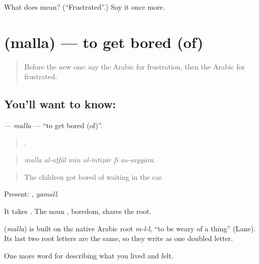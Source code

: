 \begin{tcolorbox}[breakable,colback=teal!4,colframe=teal!35!black,title={Before you move on}]
What does  mean? (\textquotedblleft{}Frustrated\textquotedblright{}.) Say it once more.
\end{tcolorbox}
\section[\texorpdfstring{\ar{مل} (malla)}{مل (malla)}]{ (malla) — to get bored (of)}

\label{lesson:AR-C494-malla}



\begin{quote}
Before the new one: say the Arabic for frustration, then the Arabic for frustrated.
\end{quote}

\subsection*{You'll want to know: }
\textbf{} — \emph{malla} — \textquotedblleft{}to get bored (of)\textquotedblright{}.

\begin{quote}
     .
\end{quote}

\begin{quote}
\emph{malla al-aṭfāl min al-intiẓār fī as-sayyāra.}
\end{quote}

\begin{quote}
The children got bored of waiting in the car.
\end{quote}

Present: , \emph{yamall}.

It takes . The noun , boredom, shares the root.

\begin{cousinweb}
\textbf{} (\emph{malla}) is built on the native Arabic root \emph{m-l-l}, \textquotedblleft{}to be weary of a thing\textquotedblright{} (Lane). Its last two root letters are the same, so they write as one doubled letter.
\end{cousinweb}

\begin{grammarlens}[title={What you've built}]
One more word for describing what you lived and felt.
\end{grammarlens}


